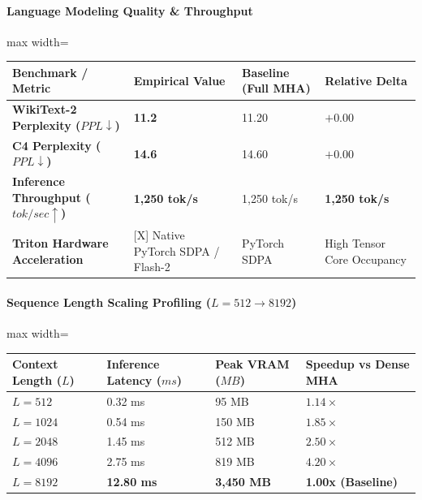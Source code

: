 \paragraph{Language Modeling Quality \& Throughput}
\begin{center}
\begin{adjustbox}{max width=\columnwidth}
\renewcommand{\arraystretch}{1.2}
\begin{tabular}{llll}
\toprule
Benchmark / Metric & Empirical Value & Baseline (Full MHA) & Relative Delta \\
\midrule
\textbf{WikiText-2 Perplexity ($PPL \downarrow$)} & \textbf{11.2} & 11.20 & $+0.00$ \\
\textbf{C4 Perplexity ($PPL \downarrow$)} & \textbf{14.6} & 14.60 & $+0.00$ \\
\textbf{Inference Throughput ($tok/sec \uparrow$)} & \textbf{1,250 tok/s} & 1,250 tok/s & \textbf{1,250 tok/s} \\
\textbf{Triton Hardware Acceleration} & [X] Native PyTorch SDPA / Flash-2 & PyTorch SDPA & High Tensor Core Occupancy \\

\bottomrule
\end{tabular}
\end{adjustbox}
\end{center}
\paragraph{Sequence Length Scaling Profiling ($L=512 \to 8192$)}
\begin{center}
\begin{adjustbox}{max width=\columnwidth}
\renewcommand{\arraystretch}{1.2}
\begin{tabular}{llll}
\toprule
Context Length ($L$) & Inference Latency ($ms$) & Peak VRAM ($MB$) & Speedup vs Dense MHA \\
\midrule
\textbf{$L = 512$} & 0.32 ms & 95 MB & $1.14\times$ \\
\textbf{$L = 1024$} & 0.54 ms & 150 MB & $1.85\times$ \\
\textbf{$L = 2048$} & 1.45 ms & 512 MB & $2.50\times$ \\
\textbf{$L = 4096$} & 2.75 ms & 819 MB & $4.20\times$ \\
\textbf{$L = 8192$} & \textbf{12.80 ms} & \textbf{3,450 MB} & \textbf{1.00x (Baseline)} \\


\bottomrule
\end{tabular}
\end{adjustbox}
\end{center}

